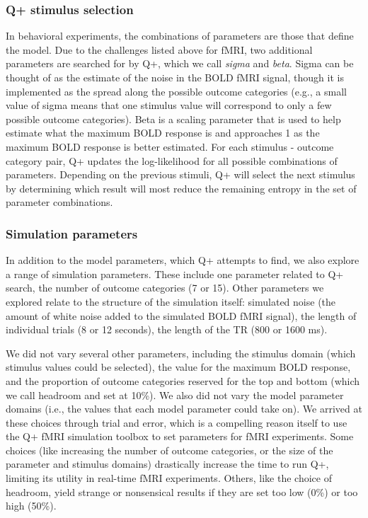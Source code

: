 \documentclass[
  english,
  man,floatsintext]{apa6}
\begin{document}
\hypertarget{q-stimulus-selection}{%
\subsubsection{Q+ stimulus selection}\label{q-stimulus-selection}}

In behavioral experiments, the combinations of parameters are those that define the model. Due to the challenges listed above for fMRI, two additional parameters are searched for by Q+, which we call \emph{sigma} and \emph{beta}. Sigma can be thought of as the estimate of the noise in the BOLD fMRI signal, though it is implemented as the spread along the possible outcome categories (e.g., a small value of sigma means that one stimulus value will correspond to only a few possible outcome categories). Beta is a scaling parameter that is used to help estimate what the maximum BOLD response is and approaches 1 as the maximum BOLD response is better estimated.
For each stimulus - outcome category pair, Q+ updates the log-likelihood for all possible combinations of parameters. Depending on the previous stimuli, Q+ will select the next stimulus by determining which result will most reduce the remaining entropy in the set of parameter combinations.

\hypertarget{simulation-parameters}{%
\subsubsection{Simulation parameters}\label{simulation-parameters}}

In addition to the model parameters, which Q+ attempts to find, we also explore a range of simulation parameters. These include one parameter related to Q+ search, the number of outcome categories (7 or 15). Other parameters we explored relate to the structure of the simulation itself: simulated noise (the amount of white noise added to the simulated BOLD fMRI signal), the length of individual trials (8 or 12 seconds), the length of the TR (800 or 1600 ms).

We did not vary several other parameters, including the stimulus domain (which stimulus values could be selected), the value for the maximum BOLD response, and the proportion of outcome categories reserved for the top and bottom (which we call headroom and set at 10\%). We also did not vary the model parameter domains (i.e., the values that each model parameter could take on). We arrived at these choices through trial and error, which is a compelling reason itself to use the Q+ fMRI simulation toolbox to set parameters for fMRI experiments. Some choices (like increasing the number of outcome categories, or the size of the parameter and stimulus domains) drastically increase the time to run Q+, limiting its utility in real-time fMRI experiments. Others, like the choice of headroom, yield strange or nonsensical results if they are set too low (0\%) or too high (50\%).
\end{document}
